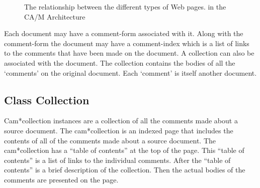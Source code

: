 \begin{figure}[htb] 
  \centerline{}
  \caption{The relationship between the different types of Web pages. in the CA/M Architecture}
  \label{fig:relation}
\end{figure}

Each document may have a comment-form associated with it.  Along with the
comment-form the document may have a comment-index which is a list of links
to the comments that have been made on the document.  A collection can also
be associated with the document.  The collection contains the bodies of all
the `comments' on the original document.  Each `comment' is itself another
document. 

\clearpage

\subsection{Class Collection}


Cam*collection instances are a collection of all the comments made about a
source document.  The cam*collection is an indexed page that includes the
contents of all of the comments made about a source document.  The
cam*collection has a ``table of contents'' at the top of the page.  This
``table of contents'' is a list of links to the individual comments.  After
the ``table of contents'' is a brief description of the collection.  Then
the actual bodies of the comments are presented on the page.

